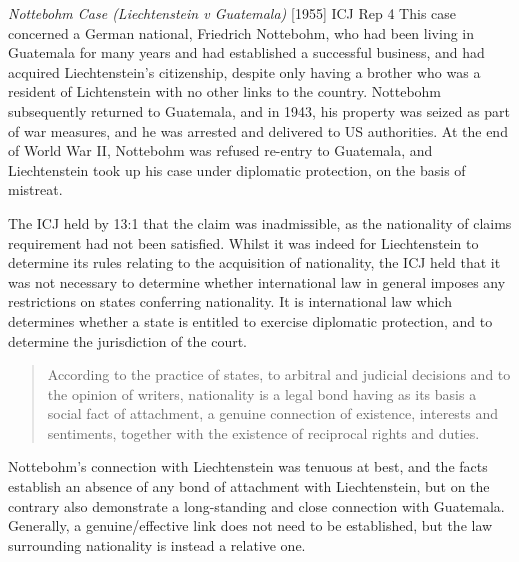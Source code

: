 \begin{casedetails}{\textit{Nottebohm Case (Liechtenstein v Guatemala)} [1955] ICJ Rep 4}
    \flushleft
    This case concerned a German national, Friedrich Nottebohm, who had been living in Guatemala for many years and had established a successful business, and had acquired Liechtenstein's citizenship, despite only having a brother who was a resident of Lichtenstein with no other links to the country. Nottebohm subsequently returned to Guatemala, and in 1943, his property was seized as part of war measures, and he was arrested and delivered to US authorities. At the end of World War II, Nottebohm was refused re-entry to Guatemala, and Liechtenstein took up his case under diplomatic protection, on the basis of mistreat.

    \vspace{\baselineskip}

    The ICJ held by 13:1 that the claim was inadmissible, as the nationality of claims requirement had not been satisfied. Whilst it was indeed for Liechtenstein to determine its rules relating to the acquisition of nationality, the ICJ held that it was not necessary to determine whether international law in general imposes any restrictions on states conferring nationality. It is international law which determines whether a state is entitled to exercise diplomatic protection, and to determine the jurisdiction of the court.

    \begin{quote}
       According to the practice of states, to arbitral and judicial decisions and to the opinion of writers, nationality is a legal bond having as its basis a social fact of attachment, a genuine connection of existence, interests and sentiments, together with the existence of reciprocal rights and duties. 
    \end{quote}

    Nottebohm's connection with Liechtenstein was tenuous at best, and the facts establish an absence of any bond of attachment with Liechtenstein, but on the contrary also demonstrate a long-standing and close connection with Guatemala. Generally, a genuine/effective link does not need to be established, but the law surrounding nationality is instead a relative one.
\end{casedetails}


